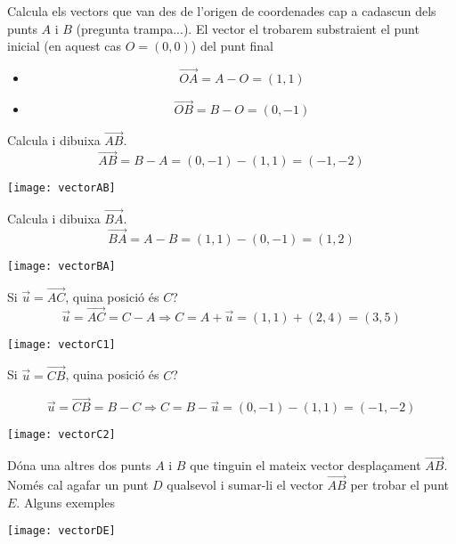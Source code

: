 \Answer
\begin{llista}
  \item Calcula els vectors que van des de l'origen de coordenades cap a cadascun dels punts $A$ i $B$ (pregunta trampa...). El vector el trobarem substraient el punt inicial (en aquest cas $O=(0,0)$) del punt final
    \begin{itemize}
      \item \[\overrightarrow{OA}=A-O=(1,1)\]
      \item \[\overrightarrow{OB}=B-O=(0,-1)\]
    \end{itemize}
  \item Calcula i dibuixa $\overrightarrow{AB}$. 
    \[\overrightarrow{AB}=B-A=(0,-1)-(1,1)=(-1,-2)\]
    \begin{center}
      \texttt{[image: vectorAB]}
   \end{center}
  \item Calcula i dibuixa $\overrightarrow{BA}$.
    \[\overrightarrow{BA}=A-B=(1,1)-(0,-1)=(1,2)\]
    \begin{center}
      \texttt{[image: vectorBA]}
    \end{center}
  \item Si $\vec{u}=\overrightarrow{AC}$, quina posició és $C$?
  \[\vec{u}=\overrightarrow{AC} = C-A \Rightarrow C=A+\vec{u}=(1,1)+(2,4)=(3,5)\]
  \begin{center}
    \texttt{[image: vectorC1]}
  \end{center}
  \item Si $\vec{u}=\overrightarrow{CB}$, quina posició és $C$?
  \item   \[\vec{u}=\overrightarrow{CB} = B-C \Rightarrow C=B-\vec{u}=(0,-1)-(1,1)=(-1,-2)\]
  \begin{center}
    \texttt{[image: vectorC2]}
  \end{center}

  \item Dóna una altres dos punts $A$ i $B$ que tinguin el mateix vector desplaçament $\overrightarrow{AB}$.
  Només cal agafar un punt $D$ qualsevol i sumar-li el vector $\overrightarrow{AB}$ per trobar el punt $E$. Alguns exemples
  \begin{center}
    \texttt{[image: vectorDE]}
  \end{center}

\end{llista}
\blacksquare 